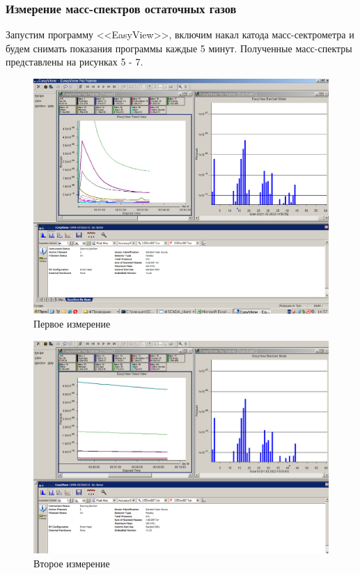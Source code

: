 \documentclass[a4paper,12pt]{article}
\begin{document}
\subsubsection*{Измерение масс-спектров остаточных газов}

Запустим программу <<EasyView>>, включим накал катода масс-сектрометра и будем снимать показания программы каждые 5 минут. Полученные масс-спектры представлены на рисунках 5 - 7.


\begin{figure}[h!]
	\begin{center}
	\includegraphics[scale=0.4]{graph1}
	\caption{Первое измерение}
	\end{center}
\end{figure}
\newpage
\begin{figure}[h!]
	\begin{center}
	\includegraphics[scale=0.4]{graph2}
	\caption{Второе измерение}
	\end{center}
\end{figure}
\end{document}
